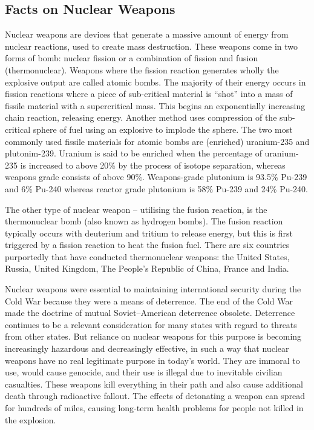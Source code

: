 \documentclass[twoside,titlepage,11pt,twocolumn,a4paper]{article}
\begin{document}
\subsection{Facts on Nuclear Weapons}
Nuclear weapons are devices that generate a massive amount of energy
from nuclear reactions, used to create mass destruction. These weapons
come in two forms of bomb: nuclear fission or a combination of fission
and fusion (thermonuclear). Weapons where the fission reaction
generates wholly the explosive output are called atomic bombs. The
majority of their energy occurs in fission reactions where a piece of
sub-critical material is ``shot'' into a mass of fissile material with
a supercritical mass. This begins an exponentially increasing chain
reaction, releasing energy. Another method uses compression of the
sub-critical sphere of fuel using an explosive to implode the
sphere. The two most commonly used fissile materials for atomic bombs
are (enriched) uranium-235 and plutonim-239. Uranium is said to be
enriched when the percentage of uranium-235 is increased to above 20\%
by the process of isotope separation, whereas weapons grade consists
of above 90\%. \citep{blackmarket} Weapons-grade plutonium is 93.5\% Pu-239 and 6\%
Pu-240 whereas reactor grade plutonium is 58\% Pu-239 and 24\% Pu-240.
\citep{drell1993}  

The other type of nuclear weapon -- utilising the fusion
reaction, is the thermonuclear bomb (also known as hydrogen bombs).
The fusion reaction typically occurs with deuterium and tritium to
release energy, but this is first triggered by a fission reaction to
heat the fusion fuel. There are six countries purportedly that have
conducted thermonuclear weapons: the United States, Russia, United
Kingdom, The People's Republic of China, France and India.  

Nuclear weapons were essential to maintaining international security during
the Cold War because they were a means of deterrence. The end of the
Cold War made the doctrine of mutual Soviet--American deterrence
obsolete. Deterrence continues to be a relevant consideration for many
states with regard to threats from other states. But reliance on
nuclear weapons for this purpose is becoming increasingly hazardous
and decreasingly effective, in such a way that nuclear weapons have no
real legitimate purpose in today’s world. They are immoral to use,
would cause genocide, and their use is illegal due to inevitable
civilian casualties. These weapons kill everything in their path and
also cause additional death through radioactive fallout. The effects
of detonating a weapon can spread for hundreds of miles, causing
long-term health problems for people not killed in the explosion.  
\end{document}
